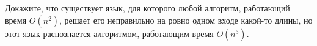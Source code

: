 Докажите, что существует язык, для которого любой алгоритм, работающий время $O(n^2)$, решает его неправильно на ровно одном
входе какой-то длины, но этот язык распознается алгоритмом, работающим время $O(n^3)$.